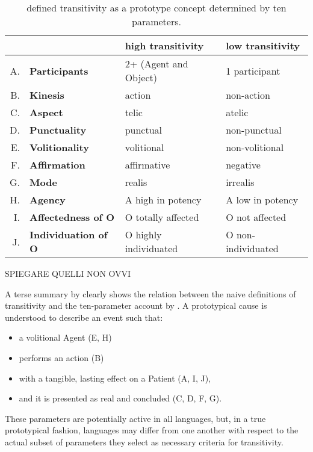 \begin{table}[htb] %
\caption{\textcite[252]{HopperThompson1980} defined transitivity as a prototype concept determined by ten parameters.}
\begin{tabular}{rl|ll}
 & & \textbf{high transitivity} & \textbf{low transitivity} \\
 \hline
A. & \textbf{Participants} & 2+ (Agent and Object)  & 1 participant  \\
B. & \textbf{Kinesis} & action  & non-action  \\
C. & \textbf{Aspect} & telic  & atelic  \\
D. & \textbf{Punctuality} & punctual  & non-punctual  \\
E. & \textbf{Volitionality} & volitional  & non-volitional  \\
F. & \textbf{Affirmation} & affirmative  & negative  \\
G. & \textbf{Mode} & realis  & irrealis  \\
H. & \textbf{Agency} & A high in potency  & A low in potency   \\
I. & \textbf{Affectedness of O} & O totally affected  & O not affected  \\
J. & \textbf{Individuation of O} & O highly individuated  & O non-individuated  
\end{tabular}
\end{table}

SPIEGARE QUELLI NON OVVI

A terse summary by \textcite[15]{Naess2007} clearly shows the relation between the naive definitions of transitivity and the ten-parameter account by \textcite{HopperThompson1980}. A prototypical cause is understood to describe an event such that:
\begin{itemize}
    \item a volitional Agent (E, H)
    \item performs an action (B)
    \item with a tangible, lasting effect on a Patient (A, I, J),
    \item and it is presented as real and concluded (C, D, F, G).
\end{itemize}

These parameters are potentially active in all languages, but, in a true prototypical fashion, languages may differ from one another with respect to the actual subset of parameters they select as necessary criteria for transitivity.



